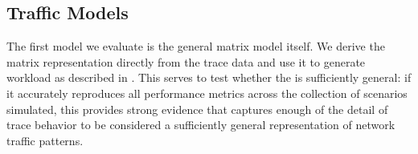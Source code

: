 \documentclass[twocolumn,final]{svjour3}
\begin{document}



\subsection{Traffic Models}
\label{sec:traffic-models}

The first model we evaluate is the general matrix model itself. We derive the matrix representation directly from the trace data and use it to generate workload as described in . This serves to test whether the  is sufficiently general: if it accurately reproduces all performance metrics across the collection of scenarios simulated, this provides strong evidence that  captures enough of the detail of trace behavior to be considered a sufficiently general representation of network traffic patterns. %
\end{document}
